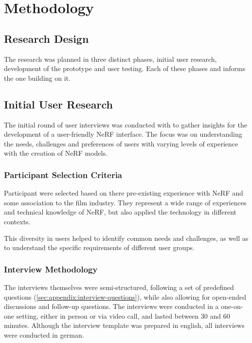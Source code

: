 %
\chapter{Methodology}
\label{sec:methodology}

\section{Research Design}
\label{sec:methodology:design}

The research was planned in three distinct phases, initial user research, development of the prototype and user testing. Each of these phases and informs the one building on it. 

\section{Initial User Research}
\label{sec:methodology:user-research}

The initial round of user interviews was conducted with to gather insights for the development of a user-friendly NeRF interface. The focus was on understanding the needs, challenges and preferences of users with varying levels of experience with the creation of NeRF models.

\subsection{Participant Selection Criteria}
\label{sec:methodology:user-research:criteria}

Participant were selected based on there pre-existing experience with NeRF and some association to the film industry. They represent a wide range of experiences and technical knowledge of NeRF, but also applied the technology in different contexts.

This diversity in users helped to identify common needs and challenges, as well as to understand the specific requirements of different user groups.

\subsection{Interview Methodology}
\label{sec:methodology:user-research:interview}

The interviews themselves were semi-structured, following a set of predefined questions (\ref{sec:appendix:interview-questions}), while also allowing for open-ended discussions and follow-up questions. 
The interviews were conducted in a one-on-one setting, either in person or via video call, and lasted between 30 and 60 minutes. 
Although the interview template was prepared in english, all interviews were conducted in german.

